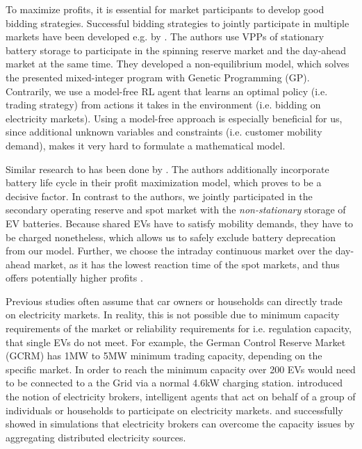 \documentclass[12pt, article]{article}
\begin{document}
To maximize profits, it is essential for market participants to develop good
bidding strategies. Successful bidding strategies to jointly participate in
multiple markets have been developed e.g. by
\textcite{mashhour11_biddin_strat_virtual_power_plant_2}. The authors use VPPs of
stationary battery storage to participate in the spinning reserve market and
the day-ahead market at the same time. They developed a non-equilibrium model,
which solves the presented mixed-integer program with Genetic Programming (GP).
Contrarily, we use a model-free RL agent that learns an optimal policy (i.e.
trading strategy) from actions it takes in the environment (i.e. bidding on
electricity markets). Using a model-free approach is especially beneficial for
us, since additional unknown variables and constraints (i.e. customer mobility
demand), makes it very hard to formulate a mathematical model.

Similar research to \textcite{mashhour11_biddin_strat_virtual_power_plant_2} has
been done by \textcite{he16_optim_biddin_strat_batter_storag}. The authors
additionally incorporate battery life cycle in their profit maximization model,
which proves to be a decisive factor. In contrast to the authors, we jointly
participated in the secondary operating reserve and spot market with the
\emph{non-stationary} storage of EV batteries. Because shared EVs have to satisfy
mobility demands, they have to be charged nonetheless, which allows us to safely
exclude battery deprecation from our model. Further, we choose the intraday
continuous market over the day-ahead market, as it has the lowest reaction time
of the spot markets, and thus offers potentially higher profits
\parencite{tomic07_using_fleet_elect_drive_vehic_grid_suppor}.

Previous studies often assume that car owners or households can directly trade
on electricity markets. In reality, this is not possible due to minimum capacity
requirements of the market or reliability requirements for i.e.
regulation capacity, that single EVs do not meet. For example, the German
Control Reserve Market (GCRM) has 1MW to 5MW minimum trading capacity, depending
on the specific market. In order to reach the minimum capacity over 200 EVs
would need to be connected to a the Grid via a normal 4.6kW charging station.
\textcite{ketter13_power_tac} introduced the notion of electricity brokers,
intelligent agents that act on behalf of a group of individuals or households to
participate on electricity markets.
\textcite{brandt17_evaluat_busin_model_vehic_grid_integ} and
\textcite{kahlen14_balan_with_elect_vehic} successfully showed in simulations that
electricity brokers can overcome the capacity issues by aggregating distributed
electricity sources.
\end{document}
